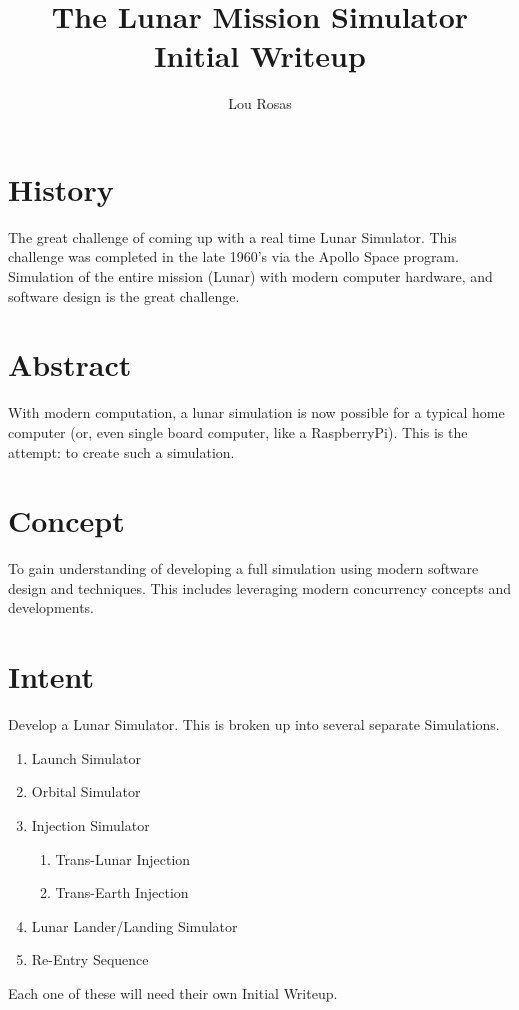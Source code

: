 \documentclass[letterpaper]{article}
\begin{document}
\title{The Lunar Mission Simulator Initial Writeup}
\author{Lou Rosas}
\maketitle

\section{History}
The great challenge of coming up with a real time Lunar Simulator.
This challenge was completed in the late 1960's via the Apollo Space
program.  Simulation of the entire mission (Lunar) with modern
computer hardware, and software design is the great challenge.

\section{Abstract}
With modern computation, a lunar simulation is now possible
for a typical home computer (or, even single board computer, like a
RaspberryPi).  This is the attempt:  to create such a simulation.

\section{Concept}
To gain understanding of developing a full simulation using
modern software design and techniques.  This includes leveraging
modern concurrency concepts and developments.

\section{Intent}
Develop a Lunar Simulator.  This is broken up into several separate
Simulations.
\begin{enumerate}
\item Launch Simulator
\item Orbital Simulator
\item Injection Simulator
\begin{enumerate}
\item Trans-Lunar Injection
\item Trans-Earth Injection
\end{enumerate}
\item Lunar Lander/Landing Simulator
\item Re-Entry Sequence
\end{enumerate}
Each one of these will need their own Initial Writeup.
\end{document}
